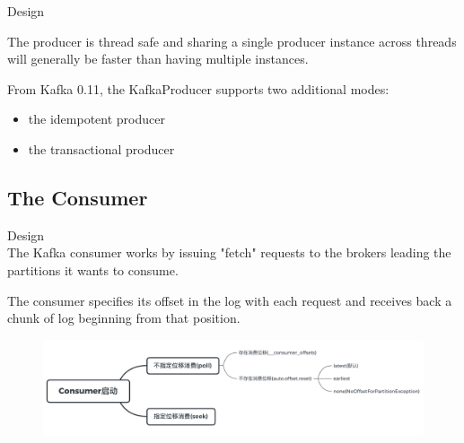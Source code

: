 \begin{frame}[plain,t]{Design} %
     \\
    \vspace{2ex}
    
    The producer is thread safe and sharing a single producer instance across threads will generally be faster than having multiple instances.
    
    \vspace{2ex}
   From Kafka 0.11, the KafkaProducer supports two additional modes: 
   \begin{itemize}
       \item  the idempotent producer
       \item the transactional producer
   \end{itemize}

    
\end{frame}
\subsection{The Consumer}
\begin{frame}[plain,t]{Design} %
     \\
    \vspace{2ex}
    The Kafka consumer works by issuing "fetch" requests to the brokers leading the partitions it wants to consume. 
    
    \vspace{2ex}
    The consumer specifies its offset in the log with each request and receives back a chunk of log beginning from that position. 
    
     \vspace{2ex}
    \begin{figure}
        \centering
        \includegraphics[width=0.9\linewidth]{image/0217}
        \label{fig:0217}
    \end{figure}
    
    
\end{frame}

